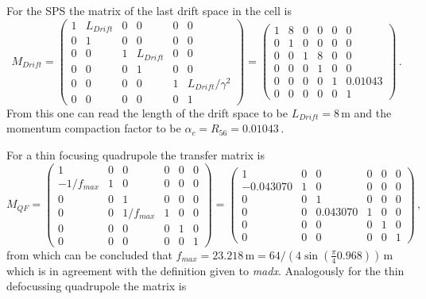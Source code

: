 For the SPS the matrix of the last drift space in the cell is
\begin{equation}
    M_{Drift}=\begin{pmatrix}
    1&L_{Drift}&0&0&0&0\\
    0&1&0&0&0&0\\
    0&0&1&L_{Drift}&0&0\\
    0&0&0&1&0&0\\
    0&0&0&0&1&L_{Drift}/\gamma^2\\
    0&0&0&0&0&1
    \end{pmatrix}=
    \begin{pmatrix}
    1&8&0&0&0&0\\
    0&1&0&0&0&0\\
    0&0&1&8&0&0\\
    0&0&0&1&0&0\\
    0&0&0&0&1&0.01043\\
    0&0&0&0&0&1
    \end{pmatrix}\,.
\end{equation}
From this one can read the length of the drift space to be $L_{Drift}=8\,\mathrm{m}$ and the momentum compaction factor to be $\alpha_c=R_{56}=0.01043\,.$
\par
For a thin focusing quadrupole the transfer matrix is
\begin{equation}
    M_{QF}=\begin{pmatrix}
    1&0&0&0&0&0\\
    -1/f_{max}&1&0&0&0&0\\
    0&0&1&0&0&0\\
    0&0&1/f_{max}&1&0&0\\
    0&0&0&0&1&0\\
    0&0&0&0&0&1
    \end{pmatrix}=
    \begin{pmatrix}
    1&0&0&0&0&0\\
    -0.043070&1&0&0&0&0\\
    0&0&1&0&0&0\\
    0&0&0.043070&1&0&0\\
    0&0&0&0&1&0\\
    0&0&0&0&0&1
    \end{pmatrix}\,,
\end{equation}
from which can be concluded that $f_{max}=23.218\,\mathrm{m}=64/\left(4\sin\left(\frac{\pi}{4}0.968\right)\right)\,\mathrm{m}$ which is in agreement with the definition given to \textit{madx}.
Analogously for the thin defocussing quadrupole the matrix is
